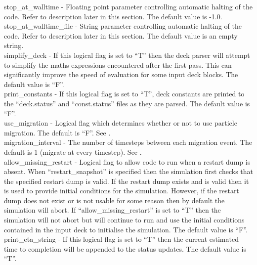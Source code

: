 {\emphtext stop\_at\_walltime} - Floating point parameter controlling
  automatic halting of the code. Refer to description later in this section.
  The default value is -1.0.\\

{\emphtext stop\_at\_walltime\_file} - String parameter controlling
  automatic halting of the code. Refer to description later in this section.
  The default value is an empty string.\\

{\emphtext simplify\_deck} - If this logical flag is set to ``T'' then the deck
  parser will attempt to simplify the maths expressions encountered after the
  first pass. This can significantly improve the speed of evaluation for some
  input deck blocks. The default value is ``F''.\\

{\emphtext print\_constants} - If this logical flag is set to ``T'', deck
  constants are printed to the ``deck.status'' and ``const.status'' files
  as they are parsed. The default value is ``F''.\\

{\emphtext use\_migration} - Logical flag which determines whether or not to
  use particle migration. The default is ``F''. See .\\

{\emphtext migration\_interval} - The number of timesteps between each
  migration event.  The default is 1 (migrate at every timestep).
  See .\\

{\emphtext allow\_missing\_restart} - Logical flag to allow code to run when
  a restart dump is absent.
  When ``restart\_snapshot'' is specified then the simulation first
  checks that the specified restart dump is valid. If the restart dump
  exists and is valid then it is used to provide initial conditions
  for the simulation.
  However, if the restart dump does not exist or is not usable for
  some reason then by default the simulation will abort.
  If ``allow\_missing\_restart'' is set to ``T'' then the simulation will
  not abort but will continue to run and use the initial conditions
  contained in the input deck to initialise the simulation.
  The default value is ``F''.\\

{\emphtext print\_eta\_string} - If this logical flag is set to ``T'' then the
  current estimated time to completion will be appended to the status
  updates. The default value is ``T''.\\

